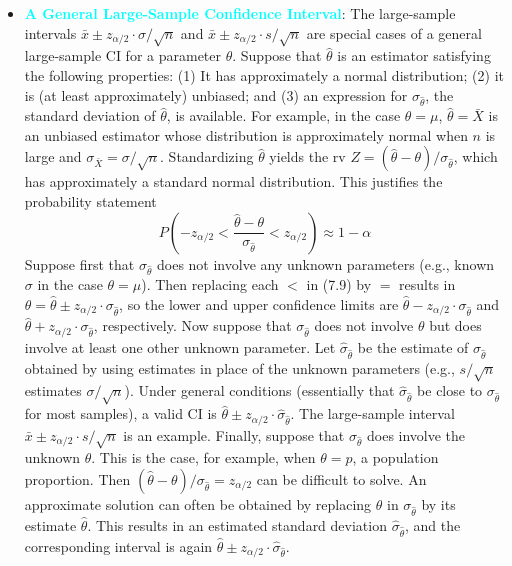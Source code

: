\documentclass{report}
\begin{document}
\begin{itemize}
        \item \textbf{\textcolor{cyan}{A General Large-Sample Confidence Interval}}:
            The large-sample intervals $\bar{x} \pm z_{\alpha/2} \cdot \sigma/\sqrt{n}$ and $\bar{x} \pm z_{\alpha/2} \cdot s/\sqrt{n}$ are special cases of a general large-sample CI for a parameter $\theta$. Suppose that $\hat{\theta}$ is an estimator satisfying the following properties: (1) It has approximately a normal distribution; (2) it is (at least approximately) unbiased; and (3) an expression for $\sigma_{\hat{\theta}}$, the standard deviation of $\hat{\theta}$, is available. For example, in the case $\theta = \mu$, $\hat{\theta} = \bar{X}$ is an unbiased estimator whose distribution is approximately normal when $n$ is large and $\sigma_{\bar{X}} = \sigma/\sqrt{n}$. Standardizing $\hat{\theta}$ yields the rv $Z = (\hat{\theta} - \theta)/\sigma_{\hat{\theta}}$, which has approximately a standard normal distribution. This justifies the probability statement
            \[
                P\left( -z_{\alpha/2} < \frac{\hat{\theta} - \theta}{\sigma_{\hat{\theta}}} < z_{\alpha/2} \right) \approx 1 - \alpha \tag{7.9}
            \]
            Suppose first that $\sigma_{\hat{\theta}}$ does not involve any unknown parameters (e.g., known $\sigma$ in the case $\theta = \mu$). Then replacing each $<$ in (7.9) by $=$ results in $\theta = \hat{\theta} \pm z_{\alpha/2} \cdot \sigma_{\hat{\theta}}$, so the lower and upper confidence limits are $\hat{\theta} - z_{\alpha/2} \cdot \sigma_{\hat{\theta}}$ and $\hat{\theta} + z_{\alpha/2} \cdot \sigma_{\hat{\theta}}$, respectively. Now suppose that $\sigma_{\hat{\theta}}$ does not involve $\theta$ but does involve at least one other unknown parameter. Let $\hat{\sigma}_{\hat{\theta}}$ be the estimate of $\sigma_{\hat{\theta}}$ obtained by using estimates in place of the unknown parameters (e.g., $s/\sqrt{n}$ estimates $\sigma/\sqrt{n}$). Under general conditions (essentially that $\hat{\sigma}_{\hat{\theta}}$ be close to $\sigma_{\hat{\theta}}$ for most samples), a valid CI is $\hat{\theta} \pm z_{\alpha/2} \cdot \hat{\sigma}_{\hat{\theta}}$. The large-sample interval $\bar{x} \pm z_{\alpha/2} \cdot s/\sqrt{n}$ is an example.
            \bigbreak \noindent 
            Finally, suppose that $\sigma_{\hat{\theta}}$ does involve the unknown $\theta$. This is the case, for example, when $\theta = p$, a population proportion. Then $(\hat{\theta} - \theta)/\sigma_{\hat{\theta}} = z_{\alpha/2}$ can be difficult to solve. An approximate solution can often be obtained by replacing $\theta$ in $\sigma_{\hat{\theta}}$ by its estimate $\hat{\theta}$. This results in an estimated standard deviation $\hat{\sigma}_{\hat{\theta}}$, and the corresponding interval is again $\hat{\theta} \pm z_{\alpha/2} \cdot \hat{\sigma}_{\hat{\theta}}$.

\end{itemize}
\end{document}
